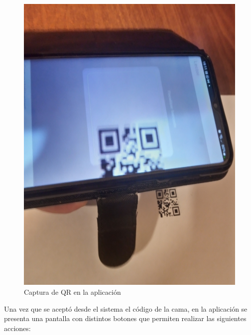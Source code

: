 \begin{figure}[ht]
	\centering
	\includegraphics[scale=.10]{./Figures/app/capturaQR.jpg}
	\caption{ Captura de QR en la aplicación}
	\label{fig: Captura de QR en la aplicación.}
\end{figure} 


Una vez que se aceptó desde el sistema el código de la cama, en la aplicación se presenta una pantalla con distintos botones que permiten realizar las siguientes acciones:

